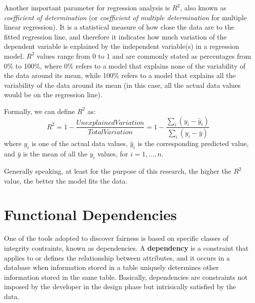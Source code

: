 Another important parameter for regression analysis is \(R^2\), also known as \textit{coefficient of determination} (or \textit{coefficient of multiple determination} for multiple linear regression). It is a statistical measure of how close the data are to the fitted regression line, and therefore it indicates how much variation of the dependent variable is explained by the independent variable(s) in a regression model. \(R^2\) values range from 0 to 1 and are commonly stated as percentages from 0\% to 100\%, where 0\% refers to a model that explains none of the variability of the data around its mean, while 100\% refers to a model that explains all the variability of the data around its mean (in this case, all the actual data values would be on the regression line).

Formally, we can define \(R^2\) as: \[R^2 = 1 - \frac{\mathit{Unexplained Variation}}{\mathit{Total Variation}} = 1 - \frac{\sum_{i}(y_i - \hat{y}_i)}{\sum_{i}(y_i - \bar{y})}\] where \(y_i\) is one of the actual data values, \(\hat{y}_i\) is the corresponding predicted value, and \(\bar{y}\) is the mean of all the \(y_i\) values, for \(i = 1, \ldots, n\).

Generally speaking, at least for the purpose of this research, the higher the \(R^2\) value, the better the model fits the data.


\section{Functional Dependencies}
One of the tools adopted to discover fairness is based on specific classes of integrity contraints, known as dependencies. A \textbf{dependency} is a constraint that applies to or defines the relationship between attributes, and it occurs in a database when information stored in a table uniquely determines other information stored in the same table. Basically, dependencies are constraints not imposed by the developer in the design phase but intrisically satisfied by the data.

